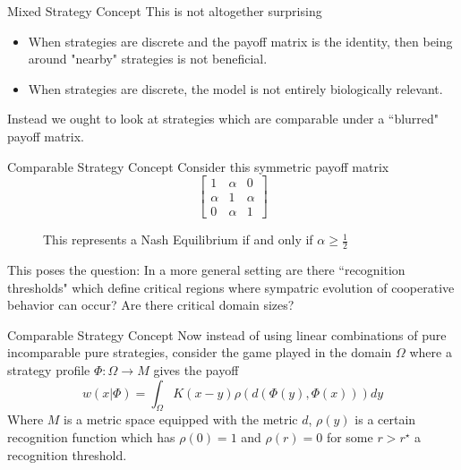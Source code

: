 \documentclass{beamer}
\begin{document}
\begin{frame}{Mixed Strategy Concept}
	This is not altogether surprising
	\begin{itemize}
		\item When strategies are discrete and the payoff matrix is the identity, then being around "nearby" strategies is not beneficial. 
		\item When strategies are discrete, the model is not entirely biologically relevant. 
	\end{itemize}
	Instead we ought to look at strategies which are comparable under a ``blurred" payoff matrix. 
\end{frame}

\begin{frame}{Comparable Strategy Concept}
	Consider this symmetric payoff matrix
	\begin{equation}
		\begin{bmatrix}
			1&\alpha&0\\
			\alpha&1&\alpha\\
			0&\alpha&1
		\end{bmatrix}
	\end{equation}
	\begin{figure} 
	\caption{This represents a Nash Equilibrium if and only if $\alpha\geq \frac{1}{2}$}
\end{figure}	
	This poses the question: In a more general setting are there ``recognition thresholds" which define critical regions where sympatric evolution of cooperative behavior can occur? Are there critical domain sizes?   
\end{frame}
	
\begin{frame}{Comparable Strategy Concept}
	Now instead of using linear combinations of pure incomparable pure strategies, consider the game played in the domain $\Omega$ where a strategy profile $\Phi:\Omega \rightarrow M$ gives the payoff
	\begin{equation}
		w(x|\Phi)= \int_\Omega K(x-y)\rho(d(\Phi(y),\Phi(x)))dy
	\end{equation}
	Where $M$ is a metric space equipped with the metric $d$, $\rho(y)$ is a certain recognition function which has $\rho (0)=1$ and $\rho(r)=0$ for some $r>r^\star$ a recognition threshold. 
\end{frame}
\end{document}
